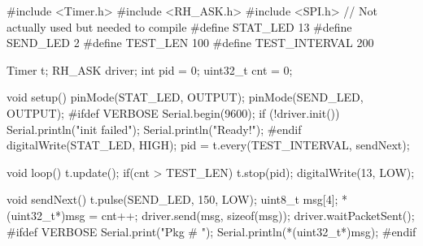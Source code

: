 #include <Timer.h>
#include <RH_ASK.h>
#include <SPI.h> // Not actually used but needed to compile
#define STAT_LED 13
#define SEND_LED 2
#define TEST_LEN 100
#define TEST_INTERVAL 200

Timer t;
RH_ASK driver;
int pid = 0;
uint32_t cnt = 0;

void setup() {
    pinMode(STAT_LED, OUTPUT);
    pinMode(SEND_LED, OUTPUT);
    #ifdef VERBOSE
    Serial.begin(9600);
    if (!driver.init())
         Serial.println("init failed");
    Serial.println("Ready!");
    #endif
    digitalWrite(STAT_LED, HIGH);
    pid = t.every(TEST_INTERVAL, sendNext);
}

void loop() {
    t.update();
    if(cnt > TEST_LEN){
      t.stop(pid);
      digitalWrite(13, LOW);
    }
}

void sendNext() {
  t.pulse(SEND_LED, 150, LOW);
  uint8_t msg[4];
  *(uint32_t*)msg = cnt++;
  driver.send(msg, sizeof(msg));
  driver.waitPacketSent();
  #ifdef VERBOSE
  Serial.print("Pkg # ");
  Serial.println(*(uint32_t*)msg);
  #endif
}